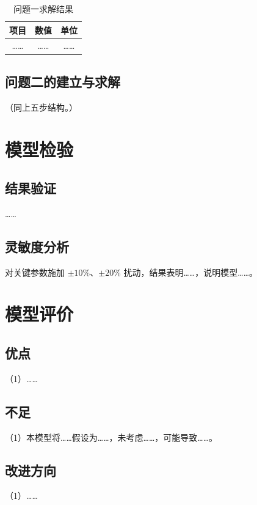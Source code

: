 \documentclass[12pt, a4paper]{ctexart}
\newcommand{\wuhao}{\fontsize{10.5pt}{13pt}\selectfont}  %
\begin{document}
\begin{table}[htbp]
  \centering
  \caption{问题一求解结果}
  \label{tab:res1}
  {\songti\wuhao
  \begin{tabular}{ccc}
    \toprule
    项目 & 数值 & 单位 \\
    \midrule
    …… & …… & …… \\
    \bottomrule
  \end{tabular}}
\end{table}

\subsection{问题二的建立与求解}
（同上五步结构。）

\section{模型检验}
\subsection{结果验证}
……

\subsection{灵敏度分析}
对关键参数施加 $\pm 10\%$、$\pm 20\%$ 扰动，结果表明……，说明模型……。

\section{模型评价}
\subsection{优点}
（1）……

\subsection{不足}
（1）本模型将……假设为……，未考虑……，可能导致……。

\subsection{改进方向}
（1）……

\end{document}
